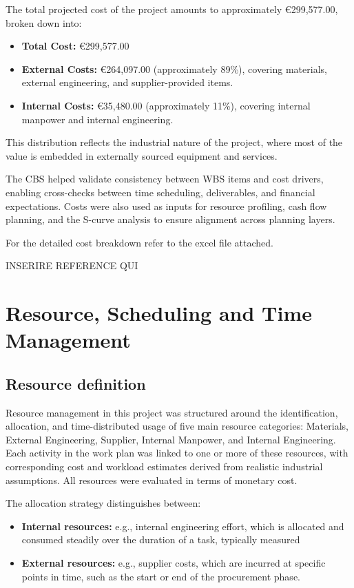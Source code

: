 The total projected cost of the project amounts to approximately €299,577.00, broken down into:
\begin{itemize}
    \item \textbf{Total Cost:} €299,577.00
    \item \textbf{External Costs:} €264,097.00 (approximately 89\%), covering materials, external engineering, and supplier-provided items.
    \item \textbf{Internal Costs:} €35,480.00 (approximately 11\%), covering internal manpower and internal engineering.
\end{itemize}

This distribution reflects the industrial nature of the project, where most of the value is embedded in externally sourced equipment and services.

The CBS helped validate consistency between WBS items and cost drivers, enabling cross-checks between time scheduling, deliverables, and financial expectations. Costs were also used as inputs for resource profiling, cash flow planning, and the S-curve analysis to ensure alignment across planning layers.

For the detailed cost breakdown refer to the excel file attached.

INSERIRE REFERENCE QUI

\section{Resource, Scheduling and Time Management}
\subsection{Resource definition}
Resource management in this project was structured around the identification, allocation, and time-distributed usage of five main resource categories: Materials, External Engineering, Supplier, Internal Manpower, and Internal Engineering. Each activity in the work plan was linked to one or more of these resources, with corresponding cost and workload estimates derived from realistic industrial assumptions. All resources were evaluated in terms of monetary cost.

The allocation strategy distinguishes between:
\begin{itemize}
    \item \textbf{Internal resources:} e.g., internal engineering effort, which is allocated and consumed steadily over the duration of a task, typically measured
    \item \textbf{External resources:} e.g., supplier costs, which are incurred at specific points in time, such as the start or end of the procurement phase.
\end{itemize}


